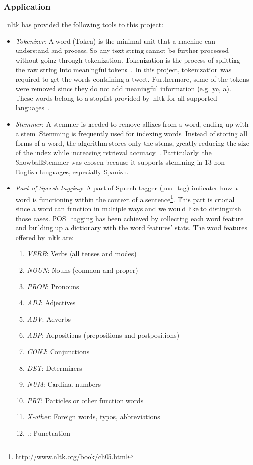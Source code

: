 \subsubsection{Application}
~\ac{nltk} has provided the following tools to this project:
\begin{itemize}
	
	\item \textit{Tokenizer}: A word (Token) is the minimal unit that a machine can understand and process. So any text string cannot be further processed without going through tokenization. Tokenization is the process of splitting the raw string into meaningful tokens~\cite{nltk}. In this project, tokenization was required to get the words containing a tweet. Furthermore, some of the tokens were removed since they do not add meaningful information (e.g. yo, a). These words belong to a stoplist provided by~\ac{nltk} for all supported languages~\cite{nltk}.
	\item \textit{Stemmer}: A stemmer is needed to remove affixes from a word, ending up with a stem. Stemming is frequently used for indexing words. Instead of storing all forms of a word, the algorithm stores only the stems, greatly reducing the size of the index while increasing retrieval accuracy~\cite{nltk}. Particularly, the SnowballStemmer was chosen because it supports stemming in 13 non-English languages, especially Spanish.
	\item \textit{Part-of-Speech tagging}:  A-part-of-Speech tagger (pos\_tag) indicates how a word is functioning within the context of a sentence\footnote{\url{http://www.nltk.org/book/ch05.html}}. This part is crucial since a word can function in multiple ways and we would like to distinguish those cases. POS\_tagging has been achieved by collecting each word feature and building up a dictionary with the word features' stats. The word features offered by~\ac{nltk} are:
	\begin{enumerate}
		\item \textit{VERB}: Verbs (all tenses and modes)
		\item \textit{NOUN}: Nouns (common and proper)
		\item \textit{PRON}: Pronouns
		\item \textit{ADJ}: Adjectives
		\item \textit{ADV}: Adverbs
		\item \textit{ADP}: Adpositions (prepositions and postpositions)
		\item \textit{CONJ}: Conjunctions
		\item \textit{DET}: Determiners
		\item \textit{NUM}: Cardinal numbers
		\item \textit{PRT}: Particles or other function words
		\item \textit{X-other}: Foreign words, typos, abbreviations
		\item \textit{.}: Punctuation
	\end{enumerate}
\end{itemize}

